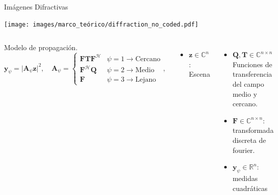 \documentclass[aspectratio=169,t,xcolor=table]{beamer}
\begin{document}
\begin{frame}{Imágenes Difractivas}
\scriptsize
\centering

    \texttt{[image: images/marco\_teórico/diffraction\_no\_coded.pdf]}%
    \begin{columns}
        
       \begin{block}{\scriptsize  Modelo de propagación.}
        \vspace{-1cm}
        \begin{equation}
            \mathbf{y}_{\psi}= \vert \mathbf{A}_\psi \mathbf{z} \vert^2, \quad \mathbf{A}_\psi = \left\{\begin{matrix}
                     \mathbf{F}\mathbf{T}\mathbf{F}^\mathcal{H}    &  \psi=1\rightarrow \text{Cercano}\\ 
                     \mathbf{F}^\mathcal{H}\mathbf{Q} & \psi=2\rightarrow\text{Medio} \\ 
                     \mathbf{F}  & \psi=3\rightarrow\text{Lejano}
                    \end{matrix}\right.,
            \label{eq:diffraction_base}
        \end{equation}

       \end{block}
        \begin{itemize}
        
         \item $\mathbf{z}\in \mathbb{C}^{n}$: Escena
         
        \end{itemize}

    \begin{itemize}
        \item $\mathbf{Q}, \mathbf{T} \in \mathbb{C}^{n \times n}$ Funciones de transferencia del campo medio y cercano.
        \item $\mathbf{F}\in\mathbb{C}^{n\times n}$: transformada discreta de fourier.
        \item $\mathbf{y}_\psi\in\mathbb{R}^n$: medidas cuadráticas
    \end{itemize}
\end{columns}
\end{frame}
\end{document}
